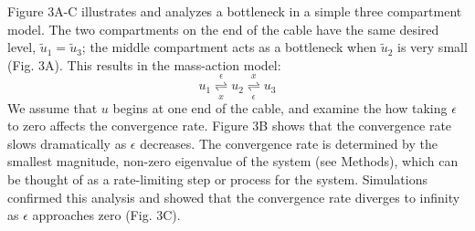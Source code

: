 \documentclass[11pt]{wlpeerj}
\begin{document}
Figure 3A-C illustrates and analyzes a bottleneck in a simple three compartment model.
The two compartments on the end of the cable have the same desired level, $\tilde{u}_1 = \tilde{u}_3$; the middle compartment acts as a bottleneck when $\tilde{u}_2$ is very small (Fig. 3A).
This results in the mass-action model:
\begin{equation}
u_1 \underset{x}{\overset{\epsilon}{\rightleftharpoons}} u_2 \underset{\epsilon}{\overset{x}{\rightleftharpoons}} u_3
\end{equation}
We assume that $u$ begins at one end of the cable, and examine the how taking $\epsilon$ to zero affects the convergence rate.
Figure 3B shows that the convergence rate slows dramatically as $\epsilon$ decreases.
The convergence rate is determined by the smallest magnitude, non-zero eigenvalue of the system (see Methods), which can be thought of as a rate-limiting step or process for the system.
Simulations confirmed this analysis and showed that the convergence rate diverges to infinity as $\epsilon$ approaches zero (Fig. 3C).
\end{document}
